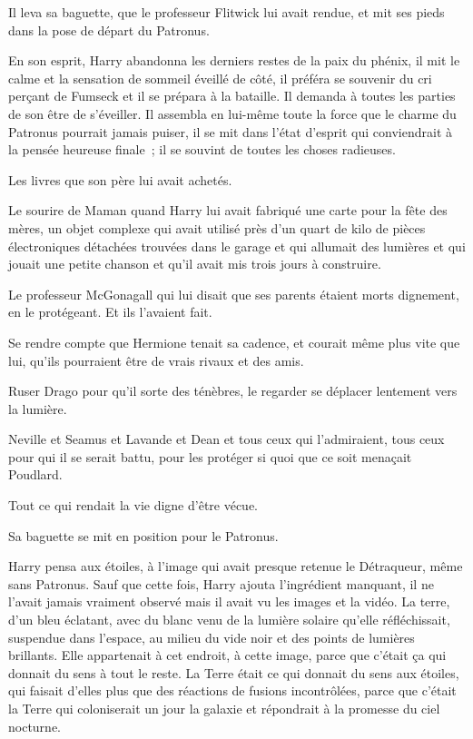 Il leva sa baguette, que le professeur Flitwick lui avait rendue, et mit ses pieds dans la pose de départ du Patronus.

En son esprit, Harry abandonna les derniers restes de la paix du phénix, il mit le calme et la sensation de sommeil éveillé de côté, il préféra se souvenir du cri perçant de Fumseck et il se prépara à la bataille. Il demanda à toutes les parties de son être de s'éveiller. Il assembla en lui-même toute la force que le charme du Patronus pourrait jamais puiser, il se mit dans l'état d'esprit qui conviendrait à la pensée heureuse finale~; il se souvint de toutes les choses radieuses.

Les livres que son père lui avait achetés.

Le sourire de Maman quand Harry lui avait fabriqué une carte pour la fête des mères, un objet complexe qui avait utilisé près d'un quart de kilo de pièces électroniques détachées trouvées dans le garage et qui allumait des lumières et qui jouait une petite chanson et qu'il avait mis trois jours à construire.

Le professeur McGonagall qui lui disait que ses parents étaient morts dignement, en le protégeant. Et ils l'avaient fait.

Se rendre compte que Hermione tenait sa cadence, et courait même plus vite que lui, qu'ils pourraient être de vrais rivaux et des amis.

Ruser Drago pour qu'il sorte des ténèbres, le regarder se déplacer lentement vers la lumière.

Neville et Seamus et Lavande et Dean et tous ceux qui l'admiraient, tous ceux pour qui il se serait battu, pour les protéger si quoi que ce soit menaçait Poudlard.

Tout ce qui rendait la vie digne d'être vécue.

Sa baguette se mit en position pour le Patronus.

Harry pensa aux étoiles, à l'image qui avait presque retenue le Détraqueur, même sans Patronus. Sauf que cette fois, Harry ajouta l'ingrédient manquant, il ne l'avait jamais vraiment observé mais il avait vu les images et la vidéo. La terre, d'un bleu éclatant, avec du blanc venu de la lumière solaire qu'elle réfléchissait, suspendue dans l'espace, au milieu du vide noir et des points de lumières brillants. Elle appartenait à cet endroit, à cette image, parce que c'était ça qui donnait du sens à tout le reste. La Terre était ce qui donnait du sens aux étoiles, qui faisait d'elles plus que des réactions de fusions incontrôlées, parce que c'était la Terre qui coloniserait un jour la galaxie et répondrait à la promesse du ciel nocturne.


